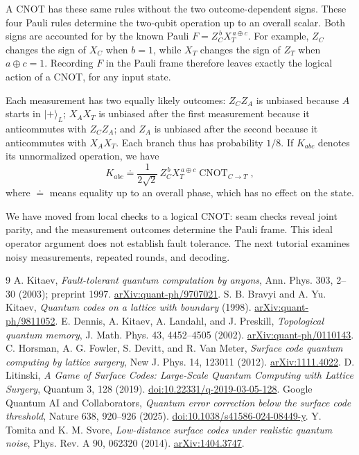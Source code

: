 \documentclass[11pt,a4paper]{article}
\newcommand{\ket}[1]{\lvert #1\rangle}
\newcommand{\cnot}{\operatorname{CNOT}}
\begin{document}
A CNOT has these same rules without the two
outcome-dependent signs. These four Pauli rules determine the two-qubit operation up to an overall scalar. Both signs are accounted for by the known Pauli $F=Z_C^{\,b}X_T^{\,a\oplus c}$.
For example, $Z_C$ changes the sign of $X_C$ when
$b=1$, while $X_T$ changes the sign of $Z_T$ when
$a\oplus c=1$. Recording $F$ in the Pauli frame
therefore leaves exactly the logical action of a
CNOT, for any input state.

Each measurement has two equally likely outcomes:
$Z_CZ_A$ is unbiased because $A$ starts in
$\ket{+}_L$; $X_AX_T$ is unbiased after the first
measurement because it anticommutes with $Z_CZ_A$;
and $Z_A$ is unbiased after the second because it
anticommutes with $X_AX_T$. Each branch thus has
probability $1/8$. If $K_{abc}$ denotes its
unnormalized operation, we have
\begin{equation}\label{eq:cnotkraus}
K_{abc}\doteq
\frac{1}{2\sqrt2}\,
Z_C^{\,b}X_T^{\,a\oplus c}\cnot_{C\to T},
\end{equation}
where $\doteq$ means equality up to an overall
phase, which has no effect on the state.

We have moved from local checks to a logical CNOT: seam checks reveal joint parity, and the measurement outcomes determine the Pauli frame. This ideal operator argument does not establish fault tolerance. The next tutorial examines noisy measurements, repeated rounds, and decoding.

\begin{thebibliography}{9}
 A. Kitaev, \emph{Fault-tolerant quantum computation by anyons}, Ann. Phys. 303, 2--30 (2003); preprint 1997. \href{https://arxiv.org/abs/quant-ph/9707021}{arXiv:quant-ph/9707021}.
 S. B. Bravyi and A. Yu. Kitaev, \emph{Quantum codes on a lattice with boundary} (1998). \href{https://arxiv.org/abs/quant-ph/9811052}{arXiv:quant-ph/9811052}.
 E. Dennis, A. Kitaev, A. Landahl, and J. Preskill, \emph{Topological quantum memory}, J. Math. Phys. 43, 4452--4505 (2002). \href{https://arxiv.org/abs/quant-ph/0110143}{arXiv:quant-ph/0110143}.
 C. Horsman, A. G. Fowler, S. Devitt, and R. Van Meter, \emph{Surface code quantum computing by lattice surgery}, New J. Phys. 14, 123011 (2012). \href{https://arxiv.org/abs/1111.4022}{arXiv:1111.4022}.
 D. Litinski, \emph{A Game of Surface Codes: Large-Scale Quantum Computing with Lattice Surgery}, Quantum 3, 128 (2019). \href{https://quantum-journal.org/papers/q-2019-03-05-128/}{doi:10.22331/q-2019-03-05-128}.
 Google Quantum AI and Collaborators, \emph{Quantum error correction below the surface code threshold}, Nature 638, 920--926 (2025). \href{https://doi.org/10.1038/s41586-024-08449-y}{doi:10.1038/s41586-024-08449-y}.
 Y. Tomita and K. M. Svore, \emph{Low-distance surface codes under realistic quantum noise}, Phys. Rev. A 90, 062320 (2014). \href{https://arxiv.org/abs/1404.3747}{arXiv:1404.3747}.
\end{thebibliography}
\end{document}
